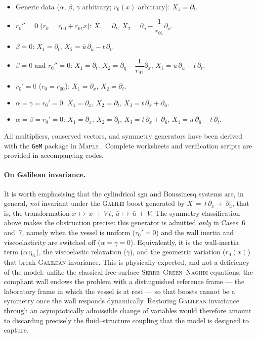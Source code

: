 \documentclass[alpha-refs, 12pt]{wiley-article}
\begin{document}
\begin{itemize}
  \item[\textbf{Case 1.}]
    Generic data ($\alpha$, $\beta$, $\gamma$ arbitrary; $r_{0}(x)$ arbitrary):\;
    $X_{1}=\partial_{t}$.
  \item[\textbf{Case 2.}]
    $r_{0}''=0$ ($r_{0}=r_{00}+r_{01}x$):\;
    $X_{1}=\partial_{t}$,\;
    $X_{2}=\partial_{\eta}-\dfrac{1}{r_{01}}\partial_{x}$.
  \item[\textbf{Case 3.}]
    $\beta=0$:\;
    $X_{1}=\partial_{t}$,\;
    $X_{2}=\bar{u}\,\partial_{\bar{u}}-t\,\partial_{t}$.
  \item[\textbf{Case 4.}]
    $\beta=0$ and $r_{0}''=0$:\;
    $X_{1}=\partial_{t}$,\;
    $X_{2}=\partial_{\eta}-\dfrac{1}{r_{01}}\partial_{x}$,\;
    $X_{3}=\bar{u}\,\partial_{\bar{u}}-t\,\partial_{t}$.
  \item[\textbf{Case 5.}]
    $r_{0}'=0$ ($r_{0}=r_{00}$):\;
    $X_{1}=\partial_{x}$,\;
    $X_{2}=\partial_{t}$.
  \item[\textbf{Case 6.}]
    $\alpha=\gamma=r_{0}'=0$:\;
    $X_{1}=\partial_{x}$,\;
    $X_{2}=\partial_{t}$,\;
    $X_{3}=t\,\partial_{x}+\partial_{\bar{u}}$.
  \item[\textbf{Case 7.}]
    $\alpha=\beta=r_{0}'=0$:\;
    $X_{1}=\partial_{x}$,\;
    $X_{2}=\partial_{t}$,\;
    $X_{3}=t\,\partial_{x}+\partial_{\bar{u}}$,\;
    $X_{4}=\bar{u}\,\partial_{\bar{u}}-t\,\partial_{t}$.
  \end{itemize}
All multipliers, conserved vectors, and symmetry generators have been derived with the \texttt{GeM} package in \textsc{Maple} \cite{Cheviakov2007}. Complete worksheets and verification scripts are provided in accompanying codes.

\paragraph{On Galilean invariance.} It is worth emphasising that the cylindrical \acrshort{sgn} and Boussinesq systems are, in general, \emph{not} invariant under the \textsc{Galilei} boost generated by $X\,=\,t\,\partial_{x}\,+\,\partial_{\bar{u}}$, that is, the transformation $x\,\mapsto\,x\,+\,V\,t$, $\bar{u}\,\mapsto\,\bar{u}\,+\,V$. The symmetry classification above makes the obstruction precise: this generator is admitted \emph{only} in Cases~6 and~7, namely when the vessel is uniform ($r_{0}'=0$) and the wall inertia and viscoelasticity are switched off ($\alpha=\gamma=0$). Equivalently, it is the wall-inertia term ($\alpha\,\eta_{tt}$), the viscoelastic relaxation ($\gamma$), and the geometric variation ($r_{0}(x)$) that break \textsc{Galilean} invariance. This is physically expected, and not a deficiency of the model: unlike the classical free-surface \textsc{Serre}--\textsc{Green}--\textsc{Naghdi} equations, the compliant wall endows the problem with a distinguished reference frame --- the laboratory frame in which the vessel is at rest --- so that boosts cannot be a symmetry once the wall responds dynamically. Restoring \textsc{Galilean} invariance through an asymptotically admissible change of variables would therefore amount to discarding precisely the fluid--structure coupling that the model is designed to capture.
\end{document}
